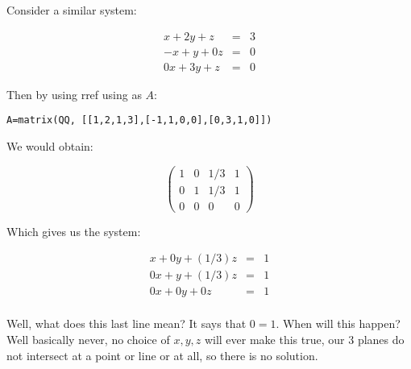 \documentclass[10pt]{article}
\theoremstyle{definition}
\begin{document}
Consider a similar system:



\begin{eqnarray*}
x+2y+z&=&3\\
-x+y+0z&=&0\\
0x+3y+z&=&0
\end{eqnarray*}

Then by using rref using as $A$:


\begin{verbatim}
A=matrix(QQ, [[1,2,1,3],[-1,1,0,0],[0,3,1,0]])
\end{verbatim}

We would obtain:


$$ \left( \begin{array}{rrr|r}
1 & 0 & 1/3& 1\\
0 & 1 & 1/3 & 1\\
0 & 0 & 0 & 0
\end{array}\right)$$

Which gives us the system:

\begin{eqnarray*}
x+0y+(1/3)z&=&1\\
0x+y+(1/3)z&=&1\\
0x+0y+0z&=&1\\
\end{eqnarray*}


Well, what does this last line mean?  It says that $0=1$.  When will this happen?  Well basically never, no choice of $x,y,z$ will ever make this true, our 3 planes do not intersect at a point or line or at all, so there is no solution.  
\end{document}
